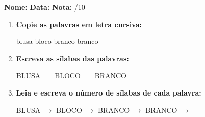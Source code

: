 \begin{exercicio}



\noindent\textbf{Nome:} \underline{\hspace{3.2cm}} \quad \textbf{Data:} \underline{\hspace{1.6cm}} \quad \textbf{Nota:} \underline{\hspace{0.9cm}}/10


\begin{enumerate}

  \item \textbf{Copie as palavras em letra cursiva:}
  \begin{center}
  blusa \quad bloco \quad branco \quad branco
  \end{center}
  \begin{center}
  \underline{\hspace{2.4cm}} \quad \underline{\hspace{2.4cm}} \quad \underline{\hspace{2.4cm}} \quad \underline{\hspace{2.4cm}}
  \end{center}

  \item \textbf{Escreva as sílabas das palavras:}
  \begin{center}
  BLUSA $=$ \underline{\hspace{1.5cm}} \underline{\hspace{1.5cm}} \quad BLOCO $=$ \underline{\hspace{1.5cm}} \underline{\hspace{1.5cm}} \quad BRANCO $=$ \underline{\hspace{1.5cm}} \underline{\hspace{1.5cm}}
  \end{center}

  \item \textbf{Leia e escreva o número de sílabas de cada palavra:}
  \begin{center}
  BLUSA $\rightarrow$ \underline{\hspace{0.9cm}} \quad BLOCO $\rightarrow$ \underline{\hspace{0.9cm}} \quad BRANCO $\rightarrow$ \underline{\hspace{0.9cm}} \quad BRANCO $\rightarrow$ \underline{\hspace{0.9cm}}
  \end{center}


\end{enumerate}
\end{exercicio}
